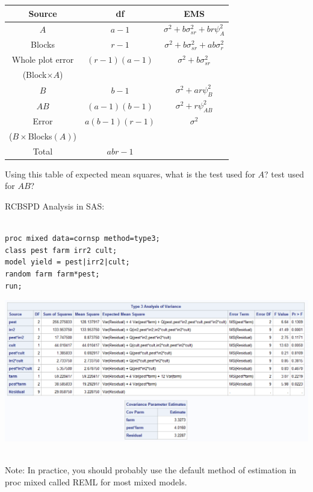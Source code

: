 \begin{center}
\begin{tabular}{ccc}  \hline
Source & df & EMS  \\ \hline
$A$ & $a-1$ & $\sigma^2 +  b \sigma_{sr}^2 + br \psi_A^2$ \\
Blocks & $r-1$ & $\sigma^2 + b \sigma_{sr}^2 + ab \sigma_r^2$ \\
Whole plot error & $(r-1)(a-1)$ & $\sigma^2 + b \sigma_{sr}^2$ \\
(Block$\times A$) \\
$B$ & $b-1$ & $\sigma^2 + ar \psi_B^2$ \\
$AB$ & $(a-1)(b-1)$ & $\sigma^2 + r \psi_{AB}^2$ \\
Error & $a(b-1)(r-1)$ & $\sigma^2$\\ 
($B\times$Blocks$(A)$) &  \\ \hline
Total & $abr-1$ & \\ \hline
\end{tabular}
\end{center}
Using this table of expected mean squares, what is the test used for $A$?  test used for $AB$?

\newpage


RCBSPD Analysis in SAS:\\~\\

\begin{small}
\begin{verbatim}
proc mixed data=cornsp method=type3;
class pest farm irr2 cult;
model yield = pest|irr2|cult;
random farm farm*pest;
run;
\end{verbatim}
\end{small}

\begin{center}
\includegraphics[scale=0.6]{CornSP6}
\end{center}


~\\
Note:  In practice, you should probably use the default method of estimation in proc mixed called REML for most mixed models.